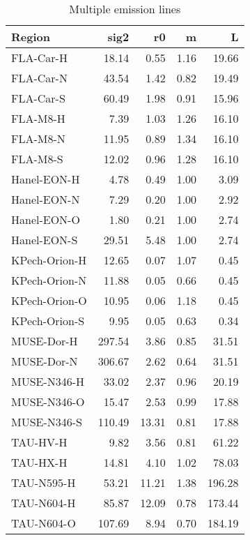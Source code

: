 \begin{table}
\centering
\caption{Multiple emission lines}
\begin{tabular}{lrrrr}
\toprule
        Region &    sig2 &     r0 &     m &       L \\
\midrule
     FLA-Car-H &   18.14 &   0.55 &  1.16 &   19.66 \\
     FLA-Car-N &   43.54 &   1.42 &  0.82 &   19.49 \\
     FLA-Car-S &   60.49 &   1.98 &  0.91 &   15.96 \\
      FLA-M8-H &    7.39 &   1.03 &  1.26 &   16.10 \\
      FLA-M8-N &   11.95 &   0.89 &  1.34 &   16.10 \\
      FLA-M8-S &   12.02 &   0.96 &  1.28 &   16.10 \\
   Hanel-EON-H &    4.78 &   0.49 &  1.00 &    3.09 \\
   Hanel-EON-N &    7.29 &   0.20 &  1.00 &    2.92 \\
   Hanel-EON-O &    1.80 &   0.21 &  1.00 &    2.74 \\
   Hanel-EON-S &   29.51 &   5.48 &  1.00 &    2.74 \\
 KPech-Orion-H &   12.65 &   0.07 &  1.07 &    0.45 \\
 KPech-Orion-N &   11.88 &   0.05 &  0.66 &    0.45 \\
 KPech-Orion-O &   10.95 &   0.06 &  1.18 &    0.45 \\
 KPech-Orion-S &    9.95 &   0.05 &  0.63 &    0.34 \\
    MUSE-Dor-H &  297.54 &   3.86 &  0.85 &   31.51 \\
    MUSE-Dor-N &  306.67 &   2.62 &  0.64 &   31.51 \\
   MUSE-N346-H &   33.02 &   2.37 &  0.96 &   20.19 \\
   MUSE-N346-O &   15.47 &   2.53 &  0.99 &   17.88 \\
   MUSE-N346-S &  110.49 &  13.31 &  0.81 &   17.88 \\
      TAU-HV-H &    9.82 &   3.56 &  0.81 &   61.22 \\
      TAU-HX-H &   14.81 &   4.10 &  1.02 &   78.03 \\
    TAU-N595-H &   53.21 &  11.21 &  1.38 &  196.28 \\
    TAU-N604-H &   85.87 &  12.09 &  0.78 &  173.44 \\
    TAU-N604-O &  107.69 &   8.94 &  0.70 &  184.19 \\
\bottomrule
\end{tabular}
\end{table}
